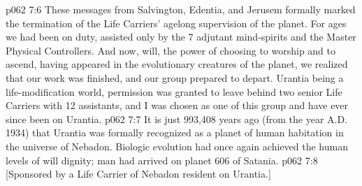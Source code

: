 \vs p062 7:6 These messages from Salvington, Edentia, and Jerusem formally marked the termination of the Life Carriers’ agelong supervision of the planet. For ages we had been on duty, assisted only by the 7 adjutant mind\hyp{}spirits and the Master Physical Controllers. And now, will, the power of choosing to worship and to ascend, having appeared in the evolutionary creatures of the planet, we realized that our work was finished, and our group prepared to depart. Urantia being a life\hyp{}modification world, permission was granted to leave behind two senior Life Carriers with 12 assistants, and I was chosen as one of this group and have ever since been on Urantia.
\vs p062 7:7 It is just 993,408 years ago (from the year A.D.\,1934) that Urantia was formally recognized as a planet of human habitation in the universe of Nebadon. Biologic evolution had once again achieved the human levels of will dignity; man had arrived on planet 606 of Satania.
\vsetoff
\vs p062 7:8 [Sponsored by a Life Carrier of Nebadon resident on Urantia.]
\quizlink
